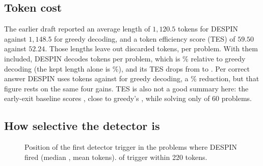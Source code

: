 \documentclass[11pt]{article}
\begin{document}
\subsection{Token cost}\label{sec:compute}

The earlier draft reported an average length of $1{,}120.5$ tokens for DESPIN against $1{,}148.5$ for greedy decoding, and a token efficiency score (TES) of $59.50$ against $52.24$. Those lengths leave out \statPrunedTotal{} discarded tokens, \statPrunedMean{} per problem. With them included, DESPIN decodes \statDespinAvgTotal{} tokens per problem, which is \statTotalRatio\% relative to greedy decoding (the kept length alone is \statFinalRatio\%), and its TES drops from \statDespinTESFinal{} to \statDespinTESTotal{}. Per correct answer DESPIN uses \statDespinTokPerCorrect{} tokens against \statGreedyTokPerCorrect{} for greedy decoding, a \statTokPerCorrectGain\% reduction, but that figure rests on the same four gains. TES is also not a good summary here: the early-exit baseline scores \statEarlyTESFinal{}, close to greedy's \statGreedyTESFinal{}, while solving only \statEarlyCorrect{} of 60 problems.

\subsection{How selective the detector is}

\begin{figure}[t]
\centering
{}
\caption{Position of the first detector trigger in the \statFirstTrigN{} problems where DESPIN fired (median \statFirstTrigMedian, mean \statFirstTrigMean{} tokens). \statFirstTrigEarly{} of \statFirstTrigN{} trigger within 220 tokens.}
\label{fig:trigger}
\end{figure}
\end{document}
